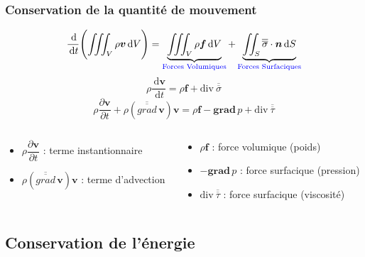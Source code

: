\documentclass[%
	final, %
	 10pt, %
 	compress, %
hyperref={bookmarks=true}	
]{beamer}
\renewcommand{\v}[1]{\ensuremath{\bm{#1}}} %
\newcommand{\ddr}[1]{\, \mathrm{d} #1}
\newcommand{\grad}[1]{\bm{grad} \, {#1}}
\newcommand{\gradd}[1]{\overline{\overline{grad}} \, \bm{#1}}
\newcommand{\diver}[1]{\textrm{div} \ {#1}}
\begin{document}
\begin{frame}\frametitle{Conservation de la quantité de mouvement}
\begin{dmath*}
\dfrac{\ddr}{\ddr t} 
\Biggl(
 \iiint _{V} \rho \v{v} \ddr V  \Biggr) =   \underbrace{\iiint_{V} \rho \v{f} \ddr
  V}_{\textcolor{blue}{\text{\scriptsize Forces Volumiques}}} +
 \underbrace{\iint_{S} \overline{\overline{\sigma}} \cdot \v{n} \ddr
S}_{\textcolor{blue}{\text{\scriptsize Forces Surfaciques}}}
\end{dmath*}
\begin{dmath*}
\rho \dfrac{\ddr  \v{v}}{\ddr t} = \rho \v{f} +
\diver{\overline{\overline{\sigma}}}
\end{dmath*}
\begin{dmath*}
\rho \dfrac{\partial  \v{v}}{\partial t} + \rho \left( \gradd{\v{v}}
\right) \v{v} = \rho \v{f} - \grad{p} +
\diver{\overline{\overline{\tau}}}
\end{dmath*}
\small
\begin{columns}
\begin{column}{5cm}
\begin{itemize}
\item $\rho \dfrac{\partial  \v{v}}{\partial t}$ : terme
  instantionnaire
\item $\rho \left( \gradd{\v{v}}
\right) \v{v}$ : terme d'advection
\end{itemize}
\end{column}
\begin{column}{5cm}
\begin{itemize}
\item $\rho \v{f}$ : force volumique (poids)
\item $- \grad{p}$ : force surfacique (pression)
\item $\diver{\overline{\overline{\tau}}}$ : force surfacique (viscosité)
\end{itemize}
\end{column}
\end{columns}
\end{frame}



\subsection{Conservation de l'énergie}
\label{sec:cons-de-lenerg}
\end{document}
